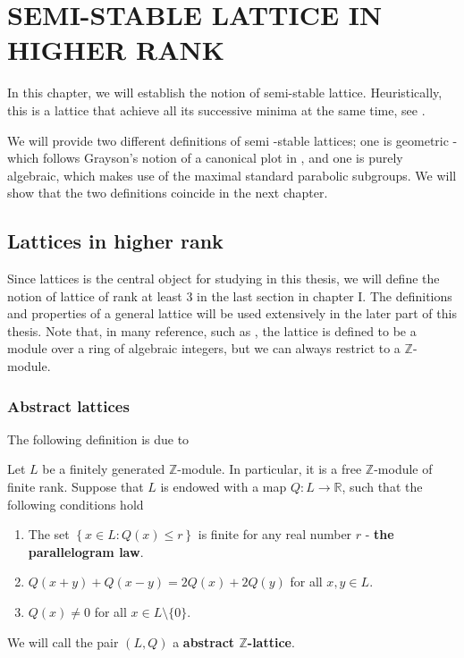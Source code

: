 \chapter{SEMI-STABLE LATTICE IN HIGHER RANK}
In this chapter, we will establish the notion of semi-stable lattice. Heuristically,
this is a lattice that achieve all its successive minima at the same time, see \cite{MR2153282}.

We will provide two different definitions of semi -stable lattices; one is geometric - which follows Grayson's notion of a canonical plot in \cite{MR780079}, and one is purely algebraic, which makes use of the maximal standard parabolic subgroups. We will show that the two definitions coincide in the next chapter.
\section{Lattices in higher rank}
Since lattices is the central object for studying in this thesis, we will define the notion of lattice of rank at least 3 in the last section in chapter I.
The definitions and properties of a general lattice will be used extensively in the later part of this thesis. Note that, in many reference, such as
\cite{MR780079}, the lattice is defined to be a module over a ring of algebraic integers, but we can always restrict to a $\mathbb{Z}$-module.
\subsection{Abstract lattices}
The following definition is due to \cite[section 4]{MR1905312}
\begin{definition}[\label = Abstract $\mathbb{Z}$-lattices]
    Let $L$ be a finitely generated $\mathbb{Z}$-module. In particular, it is a free $\mathbb{Z}$-module
    of finite rank. Suppose that $L$ is endowed with a map $Q\colon L \to \mathbb{R}$, such that
    the following conditions hold
    \begin{enumerate}
        \item The set $\left\lbrace x \in L: Q(x) \le r\right\rbrace $ is finite for any real number $r$ - \textbf{the parallelogram law}\label{parallelogram law}.
        \item $Q(x+y)+Q(x-y) = 2Q(x)+2Q(y)$ for all $x,y \in L$.
        \item $Q(x) \ne 0$ for all $x \in L \setminus \{0\}$.
    \end{enumerate}
    We will call  the pair $(L,Q)$ a \textbf{abstract $\mathbb{Z}$-lattice}.
\end{definition}

